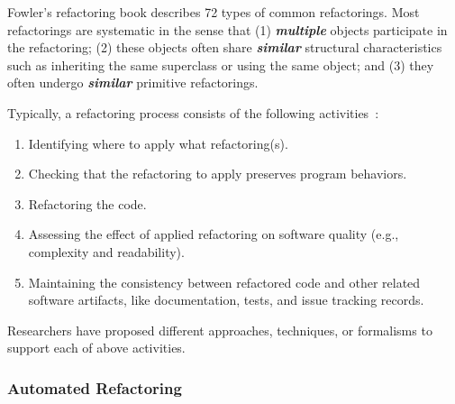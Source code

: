 \documentclass[runningheads,a4paper]{llncs}
\begin{document}
Fowler's refactoring book \cite{Fowler2000} describes 72 types of common refactorings. Most refactorings are systematic in the sense that (1) {\bf \em multiple} objects participate in the refactoring; (2) these objects often share {\bf \em similar} structural characteristics such as inheriting the same superclass or using the same object; and (3) they often undergo {\bf \em similar} primitive refactorings. 

Typically, a refactoring process consists of the following activities~\cite{Mens2004:SSR}:
\begin{enumerate}
\item Identifying where to apply what refactoring(s).
\item Checking that the refactoring to apply preserves program behaviors.
\item Refactoring the code.
\item Assessing the effect of applied refactoring on software quality (e.g., complexity and readability). 
\item Maintaining the consistency between refactored code and other related software artifacts, like documentation, tests, and issue tracking records.  
\end{enumerate}

Researchers have proposed different approaches, techniques, or formalisms to support each of above activities.

\subsubsection{Automated Refactoring} 
\end{document}
